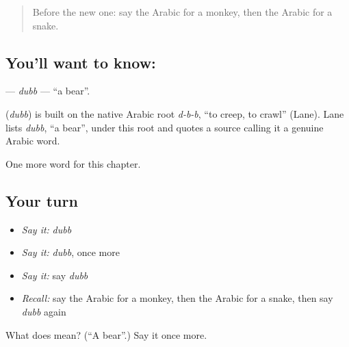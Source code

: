 \begin{quote}
Before the new one: say the Arabic for a monkey, then the Arabic for a snake.
\end{quote}

\subsection*{You'll want to know: }
\textbf{} — \emph{dubb} — \textquotedblleft{}a bear\textquotedblright{}.

\begin{cousinweb}
\textbf{} (\emph{dubb}) is built on the native Arabic root \emph{d-b-b}, \textquotedblleft{}to creep, to crawl\textquotedblright{} (Lane). Lane lists \emph{dubb}, \textquotedblleft{}a bear\textquotedblright{}, under this root and quotes a source calling it a genuine Arabic word.
\end{cousinweb}

\begin{grammarlens}[title={What you've built}]
One more word for this chapter.
\end{grammarlens}

\subsection*{Your turn}
\begin{itemize}
\raggedright
  \item \emph{Say it:} \emph{dubb}
  \item \emph{Say it:} \emph{dubb}, once more
  \item \emph{Say it:} say \emph{dubb}
  \item \emph{Recall:} say the Arabic for a monkey, then the Arabic for a snake, then say \emph{dubb} again
\end{itemize}

\begin{tcolorbox}[breakable,colback=teal!4,colframe=teal!35!black,title={Before you move on}]
What does  mean? (\textquotedblleft{}A bear\textquotedblright{}.) Say it once more.
\end{tcolorbox}
